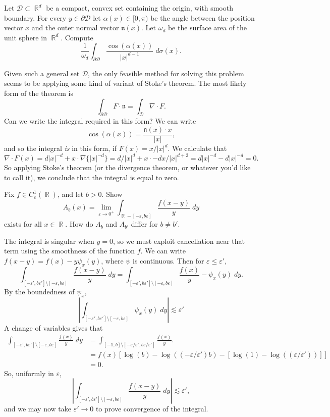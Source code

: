 \documentclass[answers]{exam}
\DeclareMathOperator{\RR}{\mathbb{R}}
\begin{document}
\begin{questions}
\question Let $\mathcal{D} \subset \RR^d$ be a compact, convex set containing the origin, with smooth boundary. For every $y \in \partial \mathcal{D}$ let $\alpha(x) \in [0,\pi)$ be the angle between the position vector $x$ and the outer normal vector $\mathfrak{n}(x)$. Let $\omega_d$ be the surface area of the unit sphere in $\RR^d$. Compute
%
\[ \frac{1}{\omega_d} \int_{\partial \mathcal{D}} \frac{\cos(\alpha(x))}{|x|^{d-1}}\; d\sigma(x). \]
\begin{solution}
	Given such a general set $\mathcal{D}$, the only feasible method for solving this problem seems to be applying some kind of variant of Stoke's theorem. The most likely form of the theorem is
	\[ \int_{\partial \mathcal{D}} F \cdot \mathfrak{n} = \int_{\mathcal{D}} \nabla \cdot F. \]
	Can we write the integral required in this form? We can write
	\[ \cos(\alpha(x)) = \frac{\mathfrak{n}(x) \cdot x}{|x|}, \]
	and so the integral \emph{is} in this form, if $F(x) = x / |x|^d$. We calculate that
	\[ \nabla \cdot F(x) = d |x|^{-d} + x \cdot \nabla \{ |x|^{-d} \} = d/|x|^d + x \cdot -d x/|x|^{d+2} = d |x|^{-d} - d |x|^{-d} = 0. \]
	So applying Stoke's theorem (or the divergence theorem, or whatever you'd like to call it), we conclude that the integral is equal to zero.
\end{solution}

\question Fix $f \in C_c^1(\RR)$, and let $b > 0$. Show
%
\[ A_b(x) = \lim_{\varepsilon \to 0^+} \int_{\RR - [-\varepsilon,b\varepsilon]} \frac{f(x-y)}{y}\; dy \]
%
exists for all $x \in \RR$. How do $A_b$ and $A_{b'}$ differ for $b \neq b'$.
\begin{solution}
	The integral is singular when $y = 0$, so we must exploit cancellation near that term using the smoothness of the function $f$. We can write $f(x - y) = f(x) - y \psi_x(y)$, where $\psi$ is continuous. Then for $\varepsilon \leq \varepsilon'$,
	\[ \int_{[-\varepsilon',b \varepsilon'] \setminus [-\varepsilon,b \varepsilon]} \frac{f(x-y)}{y}\; dy = \int_{[-\varepsilon',b \varepsilon'] \setminus [-\varepsilon,b \varepsilon]} \frac{f(x)}{y} - \psi_x(y)\; dy. \]
	By the boundedness of $\psi_x$,
	\[ \left| \int_{[-\varepsilon',b \varepsilon'] \setminus [-\varepsilon,b \varepsilon]} \psi_x(y)\; dy \right| \lesssim \varepsilon' \]
	A change of variables gives that
	\begin{align*}
		\int_{[-\varepsilon',b \varepsilon'] \setminus [-\varepsilon,b \varepsilon]} \frac{f(x)}{y}\; dy &= \int_{[-1,b] \setminus [ -\varepsilon / \varepsilon', b \varepsilon / \varepsilon' ]} \frac{f(x)}{y}.\\
		&= f(x) [ \log(b) - \log( (-\varepsilon / \varepsilon') b ) - [\log(1) - \log((\varepsilon/\varepsilon'))] ]\\
		&= 0.
	\end{align*}
	So, uniformly in $\varepsilon$,
	\[ \left| \int_{[-\varepsilon',b \varepsilon'] \setminus [-\varepsilon,b \varepsilon]} \frac{f(x-y)}{y}\; dy \right| \lesssim \varepsilon', \]
	and we may now take $\varepsilon' \to 0$ to prove convergence of the integral.


\end{solution}
\end{questions}
\end{document}
